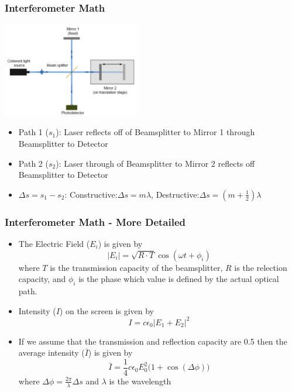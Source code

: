 \documentclass{beamer}
\begin{document}
\begin{frame}\frametitle{Interferometer Math}

\begin{center}
\includegraphics[width=6cm]{fig/interferometer2.jpg}
\end{center}


\begin{itemize}
\item Path 1 ($s_1$): Laser reflects off of Beamsplitter to Mirror 1 through Beamsplitter to Detector
\item Path 2 ($s_2$): Laser through of Beamsplitter to Mirror 2 reflects off Beamsplitter to Detector
\item $\Delta s = s_1 - s_2$: Constructive:$\Delta s = m \lambda$, Destructive:$\Delta s = (m+\frac{1}{2}) \lambda$
\end{itemize}
\end{frame}



\begin{frame}\frametitle{Interferometer Math - More Detailed}
\begin{itemize}
\item The Electric Field ($E_i$) is given by
\begin{equation}
\vert E_i \vert = \sqrt{R \cdot T} \cos{(\omega t + \phi_i)}
\end{equation}
where $T$ is the transmission capacity of the beamsplitter, $R$ is the relection capacity, and $\phi_i$ is the phase which value is defined by the actual optical path.
\item Intensity ($I$) on the screen is given by
\begin{equation}
I = c \epsilon_0 \vert E_1 + E_2 \vert^2
\end{equation}
\item If we assume that the transmission and reflection capacity are 0.5 then the average intensity ($\bar{I}$) is given by
\begin{equation}
\bar{I} = \frac{1}{4} c \epsilon_0 E_0^2 (1 + \cos{(\Delta \phi))}
\end{equation}
where $\Delta \phi = \frac{2 \pi}{\lambda} \Delta s$ and $\lambda$ is the wavelength
\end{itemize}
\end{frame}
\end{document}
